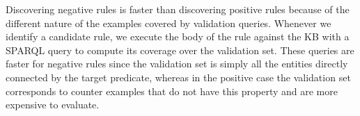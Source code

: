 Discovering negative rules is faster than discovering positive rules
because of the different nature of the examples covered by validation queries. 
Whenever we identify a candidate rule, we execute the body of the rule against the KB with a SPARQL query to compute its coverage over the validation set. 
These queries are faster for negative rules since the validation set is simply all the entities directly connected by the target predicate, whereas in the positive case the validation set corresponds to counter examples that do not have this property and are more expensive to evaluate.

%

